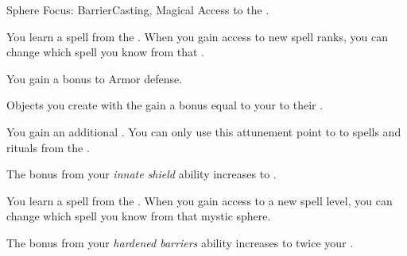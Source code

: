     \begin{feat}{Sphere Focus: Barrier}{Casting, Magical}
        \featpre Access to the  .

         You learn a spell from the  .
        When you gain access to new spell ranks, you can change which spell you know from that .

         You gain a  bonus to Armor defense.

         Objects you create with the   gain a bonus equal to your  to their .

         You gain an additional .
        You can only use this attunement point to  to spells and rituals from the  .

         The bonus from your \textit{innate shield} ability increases to .

         You learn a spell from the  .
        When you gain access to a new spell level, you can change which spell you know from that mystic sphere.

         The bonus from your \textit{hardened barriers} ability increases to twice your .
    \end{feat}

